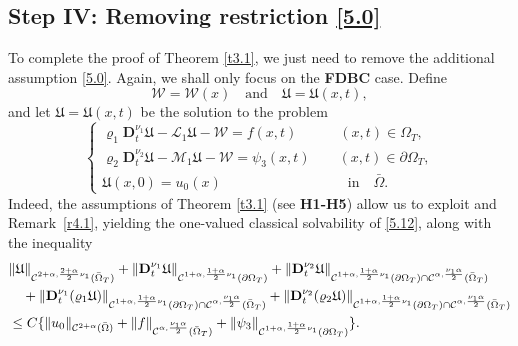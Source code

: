 \documentclass[reqno]{amsart}
\def\C {\mathcal{C}}
\theoremstyle{definition}
\numberwithin{equation}{section}
\begin{document}
\subsection{Step IV: Removing restriction \eqref{5.0}}
\label{s5.4}
To complete the proof of Theorem \ref{t3.1}, we just need to
remove the additional assumption \eqref{5.0}. 
Again, we shall only focus on the \textbf{FDBC} case.
Define
\[
\mathcal{W}=\mathcal{W}(x)\quad\text{and}\quad \mathfrak{U}=\mathfrak{U}(x,t),
\]
and let $\mathfrak{U}=\mathfrak{U}(x,t)$ be the solution to the problem
\begin{equation}\label{5.12}
\begin{cases}
\varrho_{1}\mathbf{D}_{t}^{\nu_{1}}\mathfrak{U}-\mathcal{L}_{1}\mathfrak{U}-\mathcal{W}=f(x,t)\qquad\quad (x,t)\in\Omega_{T},\\
\varrho_{2}\mathbf{D}_{t}^{\nu_{2}}\mathfrak{U}-\mathcal{M}_{1}\mathfrak{U}-\mathcal{W}=\psi_{3}(x,t)\qquad (x,t)\in\partial\Omega_{T},\\
\mathfrak{U}(x,0)=u_{0}(x)\qquad\qquad\qquad\quad\qquad \text{in}\quad\bar{\Omega}.
\end{cases}
\end{equation}
Indeed, the assumptions of Theorem \ref{t3.1} (see \textbf{H1-H5}) allow us to exploit \cite[Theorem 2]{K1} and Remark~\ref{r4.1}, yielding the one-valued classical solvability of \eqref{5.12},
along with the inequality
\begin{align}\label{5.13}\notag
&\|\mathfrak{U}\|_{\C^{2+\alpha,\frac{2+\alpha}{2}\nu_{1}}(\bar{\Omega}_{T})}+\|\mathbf{D}_{t}^{\nu_{1}}\mathfrak{U}\|_{\C^{1+\alpha,\frac{1+\alpha}{2}\nu_{1}}(\partial\Omega_{T})}+\|\mathbf{D}_{t}^{\nu_2}\mathfrak{U}\|_{\C^{1+\alpha,\frac{1+\alpha}{2}\nu_{1}}(\partial\Omega_{T})\cap\C^{\alpha,\frac{\nu_{1}\alpha}{2}}(\bar{\Omega}_{T})}
\\\notag
&
\quad +\|\mathbf{D}_{t}^{\nu_{1}}(\varrho_1 \mathfrak{U})\|_{\C^{1+\alpha,\frac{1+\alpha}{2}\nu_{1}}(\partial\Omega_{T})\cap\C^{\alpha,\frac{\nu_{1}\alpha}{2}}(\bar{\Omega}_{T})}
+
\|\mathbf{D}_{t}^{\nu_2}(\varrho_2 \mathfrak{U})\|_{\C^{1+\alpha,\frac{1+\alpha}{2}\nu_{1}}(\partial\Omega_{T})\cap\C^{\alpha,\frac{\nu_{1}\alpha}{2}}(\bar{\Omega}_{T})}
\\&
\leq C\{\|u_0\|_{\C^{2+\alpha}(\bar{\Omega})}+\|f\|_{\C^{\alpha,\frac{\nu_{1}\alpha}{2}}(\bar{\Omega}_{T})}
+
\|\psi_{3}\|_{\C^{1+\alpha,\frac{1+\alpha}{2}\nu_{1}}(\partial\Omega_{T})}
\}.
\end{align}
\end{document}
